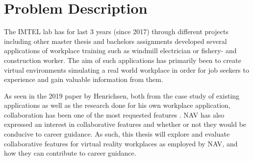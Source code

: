 









%

\section{Problem Description}
The IMTEL lab has for last 3 years (since 2017) through different projects including other master thesis and bachelors assignments developed several applications of workplace training such as windmill electrician \cite{henrichsen2019engaging} or fishery- and construction worker. The aim of such applications has primarily been to create virtual environments simulating a real world workplace in order for job seekers to experience and gain valuable information from them.

As seen in the 2019 paper by Henrichsen, both from the case study of existing applications as well as the research done for his own workplace application, collaboration has been one of the most requested features \cite{henrichsen2019engaging}. NAV has also expressed an interest in collaborative features and whether or not they would be conducive to career guidance. As such, this thesis will explore and evaluate collaborative features for virtual reality workplaces as employed by NAV, and how they can contribute to career guidance.


\clearpage

